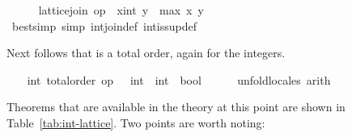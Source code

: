 \begin{isabellebody}
\ \ \ \ \isamarkupfalse%
\ {}lattice{}join\ op\ {}\ {}x{}{}int{}\ y\ {}\ max\ x\ y{}\isanewline
\ \ \ \ \ \ \isamarkupfalse%
\ {}bestsimp\ simp{}\ int{}join{}def\ int{}is{}sup{}def{}\isanewline
\ \ \isamarkupfalse%
%
\endisatagvisible
{\isafoldvisible}%
%
\isadelimvisible
%
\endisadelimvisible
%
\begin{isamarkuptext}%
Next follows that  is a total order, again for
  the integers.%
\end{isamarkuptext}%
\isamarkuptrue%
%
\isadelimvisible
\ \ %
\endisadelimvisible
%
\isatagvisible
{}\isamarkupfalse%
\ int{}\ total{}order\ {}op\ {}\ {}{}\ int\ {}\ int\ {}\ bool{}\isanewline
\ \ \ \ \isamarkupfalse%
\ unfold{}locales\ arith%
\endisatagvisible
{\isafoldvisible}%
%
\isadelimvisible
%
\endisadelimvisible
%
\begin{isamarkuptext}%
Theorems that are available in the theory at this point are shown in
  Table~\ref{tab:int-lattice}.  Two points are worth noting:


\end{isamarkuptext}
\end{isabellebody}

